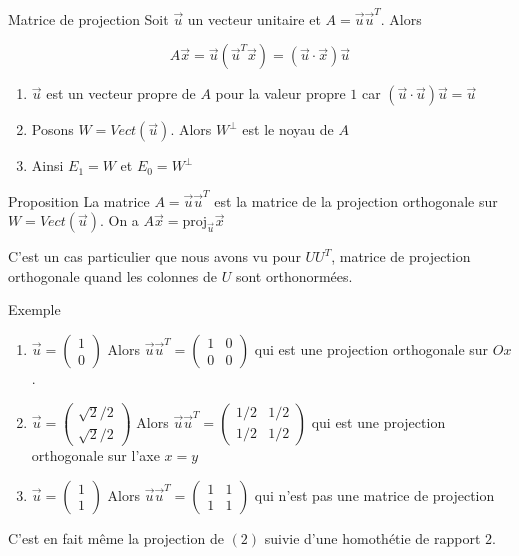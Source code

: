 \begin{parag}{Matrice de projection}
    Soit $\vec{u}$ un vecteur unitaire et $A = \vec{u}\vec{u}^T$. Alors
    \begin{formule}
        \[A\vec{x} = \vec{u}(\vec{u}^T\vec{x}) = (\vec{u}\cdot\vec{x})\vec{u}\]
    \end{formule}
    \begin{enumerate}
        \item $\vec{u}$ est un vecteur propre de $A$ pour la valeur propre $1$ car $(\vec{u}\cdot\vec{u})\vec{u} = \vec{u}$
        \item Posons $W = Vect(\vec{u})$. Alors $W^\perp$ est le noyau de $A$
        \item Ainsi $E_1 = W$ et $E_0 = W^\perp$
    \end{enumerate}
    \begin{subparag}{Proposition}
        La matrice $A = \vec{u}\vec{u}^T$ est la matrice de la projection orthogonale sur $W = Vect(\vec{u}).$ On a $A\vec{x} = \text{proj}_{\vec{u}}\vec{x}$
    \end{subparag}
    C'est un cas particulier que nous avons vu pour $UU^T$, matrice de projection orthogonale quand les colonnes de $U$ sont orthonormées.
    \begin{subparag}{Exemple}
        \begin{enumerate}
            \item $\vec{u} = \begin{pmatrix}
                1 \\ 0
            \end{pmatrix}$ Alors $\vec{u}\vec{u}^T = \begin{pmatrix}
                1 & 0 \\ 0 & 0
            \end{pmatrix}$ qui est une projection orthogonale sur $Ox$.
            \item $\vec{u} = \begin{pmatrix}
                \sqrt{2}/2\\ \sqrt{2}/2
            \end{pmatrix}$ Alors $\vec{u}\vec{u}^T = \begin{pmatrix}
                1/2 & 1/2\\ 1/2 & 1/2
            \end{pmatrix}$ qui est une projection orthogonale sur l'axe $x = y$
            \item $\vec{u} = \begin{pmatrix}
                1 \\ 1
            \end{pmatrix}$ Alors $\vec{u}\vec{u}^T = \begin{pmatrix}
                1 & 1\\ 1 & 1
            \end{pmatrix}$ qui n'est pas une matrice de projection
        \end{enumerate}
        C'est en fait même la projection de $(2)$ suivie d'une homothétie de rapport $2$.
    \end{subparag}
\end{parag}
